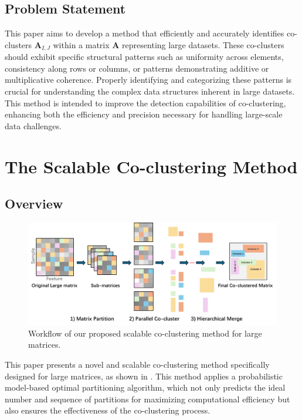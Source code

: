 \documentclass[journal]{IEEEtran}
\begin{document}
\subsection{Problem Statement}
This paper aims to develop a method that efficiently and accurately identifies co-clusters $\mathbf{A}_{I, J}$ within a matrix $\mathbf{A}$ representing large datasets. These co-clusters should exhibit specific structural patterns such as uniformity across elements, consistency along rows or columns, or patterns demonstrating additive or multiplicative coherence. Properly identifying and categorizing these patterns is crucial for understanding the complex data structures inherent in large datasets. This method is intended to improve the detection capabilities of co-clustering, enhancing both the efficiency and precision necessary for handling large-scale data challenges.

\section{The Scalable Co-clustering Method}
\label{sec:method}
\subsection{Overview}

\begin{figure}[htbp]
  \centering
  \includegraphics[width=0.8\linewidth]{workflow.png}
  \caption{Workflow of our proposed scalable co-clustering method for large matrices.}
  \label{fig:workflow}
\end{figure}

This paper presents a novel and scalable co-clustering method specifically designed for large matrices, as shown in . This method applies a probabilistic model-based optimal partitioning algorithm, which not only predicts the ideal number and sequence of partitions for maximizing computational efficiency but also ensures the effectiveness of the co-clustering process.
\end{document}
